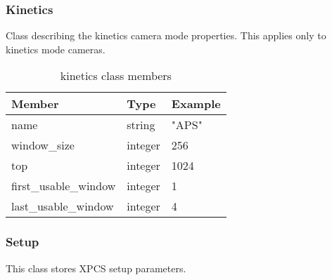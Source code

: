\newpage
\subsubsection{Kinetics}
\label{table:kinetics}

Class describing the kinetics camera mode properties. This applies only to kinetics mode cameras.

\begin{table}[h!]\sffamily \footnotesize
\caption{kinetics class members}

\begin{tabular}{p{3.5cm} p{2.5cm}  p{2.5cm} }
\toprule
\bfseries Member     & \bfseries Type & \bfseries Example \\
\midrule
name & string & "APS" \\ 
window\_size & integer & 256  \\     
top & integer &  1024  \\
first\_usable\_window & integer & 1  \\
last\_usable\_window & integer & 4  \\
\bottomrule
\end{tabular}
\end{table}





\newpage
\subsubsection{Setup}
\label{table:xpcssetup}

This class stores XPCS setup parameters.

